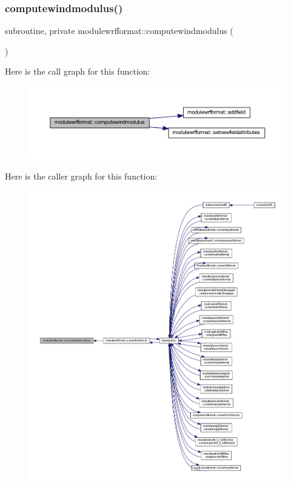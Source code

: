 \subsubsection{\texorpdfstring{computewindmodulus()}{computewindmodulus()}}
{\footnotesize\ttfamily subroutine, private modulewrfformat\+::computewindmodulus (\begin{DoxyParamCaption}{ }\end{DoxyParamCaption})\hspace{0.3cm}{\ttfamily [private]}}

Here is the call graph for this function\+:\nopagebreak
\begin{figure}[H]
\begin{center}
\leavevmode
\includegraphics[width=350pt]{namespacemodulewrfformat_a5ebdc8cdb7d4fca10d2727e8b5b542ce_cgraph}
\end{center}
\end{figure}
Here is the caller graph for this function\+:\nopagebreak
\begin{figure}[H]
\begin{center}
\leavevmode
\includegraphics[width=350pt]{namespacemodulewrfformat_a5ebdc8cdb7d4fca10d2727e8b5b542ce_icgraph}
\end{center}
\end{figure}
\mbox{\label{namespacemodulewrfformat_ae1dd204b5805dcd24b48624ce696dca4}} 
